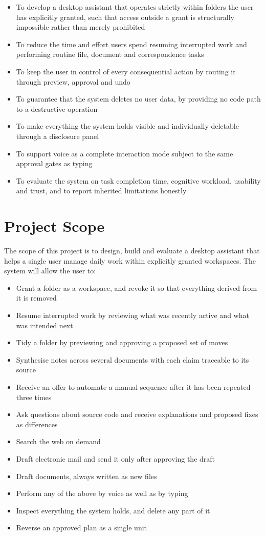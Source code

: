 \documentclass{FastFyp}
\begin{document}
\begin{itemize}
    \item To develop a desktop assistant that operates strictly within folders the user has explicitly granted, such that access outside a grant is structurally impossible rather than merely prohibited
    \item To reduce the time and effort users spend resuming interrupted work and performing routine file, document and correspondence tasks
    \item To keep the user in control of every consequential action by routing it through preview, approval and undo
    \item To guarantee that the system deletes no user data, by providing no code path to a destructive operation
    \item To make everything the system holds visible and individually deletable through a disclosure panel
    \item To support voice as a complete interaction mode subject to the same approval gates as typing
    \item To evaluate the system on task completion time, cognitive workload, usability and trust, and to report inherited limitations honestly
\end{itemize}

\section{Project Scope}
The scope of this project is to design, build and evaluate a desktop assistant that helps a single user manage daily work within explicitly granted workspaces. The system will allow the user to:

\begin{itemize}
    \item Grant a folder as a workspace, and revoke it so that everything derived from it is removed
    \item Resume interrupted work by reviewing what was recently active and what was intended next
    \item Tidy a folder by previewing and approving a proposed set of moves
    \item Synthesise notes across several documents with each claim traceable to its source
    \item Receive an offer to automate a manual sequence after it has been repeated three times
    \item Ask questions about source code and receive explanations and proposed fixes as differences
    \item Search the web on demand
    \item Draft electronic mail and send it only after approving the draft
    \item Draft documents, always written as new files
    \item Perform any of the above by voice as well as by typing
    \item Inspect everything the system holds, and delete any part of it
    \item Reverse an approved plan as a single unit
\end{itemize}
\end{document}
